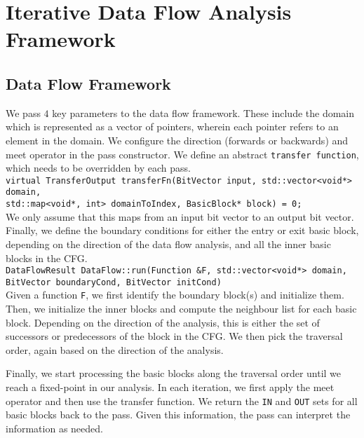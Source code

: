 \section{Iterative Data Flow Analysis Framework}

\subsection{Data Flow Framework}

We pass $4$ key parameters to the data flow framework. These include the domain
which is represented as a vector of pointers, wherein each pointer refers to
an element in the domain.
We configure the direction (forwards or backwards) and meet operator in the pass
constructor.
We define an abstract \texttt{transfer function}, which needs to be overridden
by each pass.\\

\texttt{virtual TransferOutput transferFn(BitVector input,
  std::vector<void*> domain,\\
  std::map<void*, int> domainToIndex,
  BasicBlock* block) = 0;
}\\

We only assume that this maps from an input bit vector to an output bit vector.
Finally, we define the boundary conditions for either the entry or exit basic
block, depending on the direction of the data flow analysis, and
all the inner basic blocks in the CFG.\\

\texttt{DataFlowResult DataFlow::run(Function \&F, std::vector<void*> domain,
  BitVector boundaryCond, BitVector initCond)}\\

Given a function \texttt{F}, we first identify the boundary block(s) and initialize them.
Then, we initialize the inner blocks and compute the neighbour list for each
basic block. Depending on the direction of the analysis, this is either the
set of successors or predecessors of the block in the CFG. We then pick the traversal order,
again based on the direction of the analysis.

Finally, we start processing the basic blocks along the traversal order
until we reach a fixed-point in our analysis.
In each iteration, we first apply the meet operator and then use
the transfer function. We return the \texttt{IN} and \texttt{OUT} sets for all basic blocks back to the
pass. Given this information, the pass can interpret the information as needed.

